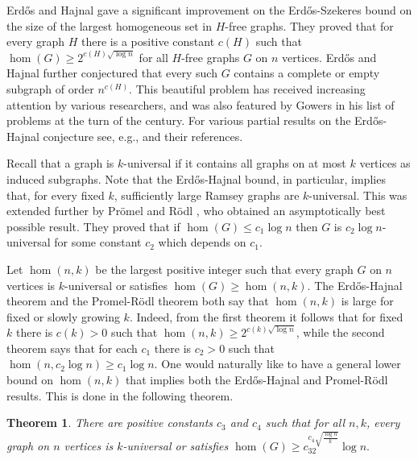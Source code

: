 \documentclass[11pt]{article}
\newtheorem{theorem}{Theorem}[section]
\begin{document}
Erd\H{o}s and Hajnal \cite{ErHa} gave a significant improvement on
the Erd\H{o}s-Szekeres bound on the size of the largest homogeneous
set in $H$-free graphs. They proved that for every graph $H$ there
is a positive constant $c(H)$ such that $\hom(G) \geq
2^{c(H)\sqrt{\log n}}$ for all $H$-free graphs $G$ on $n$ vertices.
Erd\H{o}s and Hajnal further conjectured that every such $G$
contains a complete or empty subgraph of order $n^{c(H)}$. This
beautiful problem has received increasing attention by various
researchers, and was also featured by Gowers \cite{Go1} in his list
of problems at the turn of the century. For various partial results
on the Erd\H{o}s-Hajnal conjecture see, e.g., \cite{AlPaSo, ErHaPa,
FoSu, AlPaPiRaSh, FoPaTo2, LaMaPaTo, ChSa} and their references.

Recall that a graph is $k$-universal if it contains all graphs on at
most $k$ vertices as induced subgraphs. Note that the Erd\H{o}s-Hajnal
bound, in particular, implies that, for every fixed $k$,
sufficiently large Ramsey graphs are $k$-universal. This was
extended further by Pr\"omel and R\"odl \cite{PrRo}, who obtained an
asymptotically best possible result. They proved that if $\hom(G)
\leq c_1 \log n$ then $G$ is $c_2\log n$-universal for some constant
$c_2$ which depends on $c_1$.

Let $\hom(n,k)$ be the largest positive integer such that every
graph $G$ on $n$ vertices is $k$-universal or satisfies $\hom(G)
\geq \hom(n,k)$. The Erd\H{o}s-Hajnal theorem and the Promel-R\"odl
theorem both say that $\hom(n,k)$ is large for fixed or slowly
growing $k$. Indeed, from the first theorem it follows that for
fixed $k$ there is $c(k)>0$ such that $\hom(n,k) \geq
2^{c(k)\sqrt{\log n}}$, while the second theorem says that for each
$c_1$ there is $c_2>0$ such that $\hom(n,c_2\log n) \geq c_1 \log
n$. One would naturally like to have a general lower bound on
$\hom(n,k)$ that implies both the Erd\H{o}s-Hajnal and Promel-R\"odl
results. This is done in the following theorem.

\begin{theorem}\label{combined}
There are positive constants $c_3$ and $c_4$ such that for all
$n,k$, every graph on $n$ vertices is $k$-universal or satisfies
$\hom(G) \geq c_32^{c_4\sqrt{\frac{\log n}{k}}}\log n.$
\end{theorem}
\end{document}
